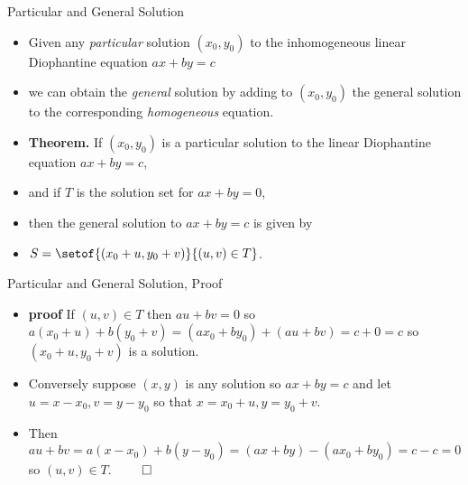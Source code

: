\documentclass[handout]{beamer}
\begin{document}

\begin{frame}{Particular and General Solution}

\begin{itemize}
  \item Given any \emph{particular} solution $(x_0,y_0)$ to the inhomogeneous linear Diophantine equation $ax+by=c$
  \item we can obtain the \emph{general} solution by adding to $(x_0,y_0)$ the general solution to the
  corresponding \emph{homogeneous} equation.
  \item \textbf{Theorem.} If $(x_0, y_0)$ is a particular solution to the linear Diophantine
  equation $ax+by=c$,
  \item and if $T$ is the solution set for
  $ax + by = 0$,
  \item then the general solution to $ax+by=c$ is given by
  \item $S=\setof{(x_0 + u, y_0 + v)}{(u,v) \in T}$.
\end{itemize}

\end{frame}


\begin{frame}{Particular and General Solution, Proof}

\begin{itemize}
  \item \textbf{proof} If $(u,v)\in T$ then $au+bv = 0$ so $a(x_0 +u) + b(y_0 +v) = (ax_0 + by_0) + (au + bv)
  =c +0 =c$ so $(x_0+u, y_0+v)$ is a solution.
  \item Conversely suppose $(x,y)$ is any solution so $ax + by = c$ and let $u=x-x_0, v=y-y_0$ so that $x=x_0+u, y=y_0+v$.
  \item Then $au + bv = a(x-x_0) + b(y-y_0) = (ax + by) - (ax_0 + by_0) = c-c = 0$ so $(u,v)\in T$. $\qed$
\end{itemize}
\end{frame}

\end{document}

